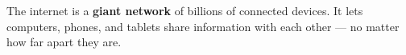 \sectionrule

\begin{bigidea}
  The internet is a \textbf{giant network} of billions of connected devices.
  It lets computers, phones, and tablets share information with each other
  — no matter how far apart they are.
\end{bigidea}

